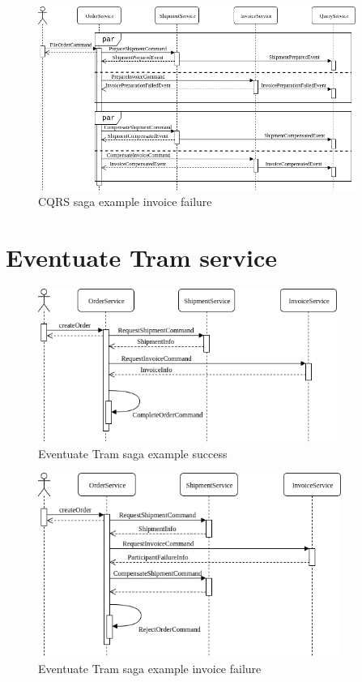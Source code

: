 \documentclass[oneside,
  digital, %
  table,   %
  lof,     %
  lot,     %
]{fithesis3}
\begin{document}
\begin{figure}[h]
    \begin{center}
        \includegraphics[height=60mm]{images/sequence/invoiceFailSagaCQRS.png}
    \end{center}
    \caption{CQRS saga example invoice failure}
\end{figure}

\section{Eventuate Tram service}

\begin{figure}[h]
    \begin{center}
        \includegraphics[height=50mm]{images/sequence/validSagaTram.png}
    \end{center}
    \caption{Eventuate Tram saga example success}
\end{figure}

\hfill \break

\begin{figure}[h]
    \begin{center}
        \includegraphics[height=60mm]{images/sequence/invoiceFailSagaTram.png}
    \end{center}
    \caption{Eventuate Tram saga example invoice failure}
\end{figure}
\end{document}
